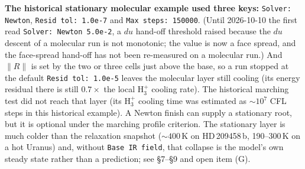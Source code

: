 \documentclass[english,a4paper]{my_memo}
\begin{document}
\textbf{The historical stationary molecular example used three keys:} \texttt{Solver: Newton}, \texttt{Resid tol: 1.0e-7} and
\texttt{Max steps: 150000}. (Until 2026-10-10 the first read
\texttt{Solver: Newton 5.0e-2}, a $du$ hand-off threshold raised because the
$du$ descent of a molecular run is not monotonic; the value is now a face
spread, and the face-spread hand-off has not been re-measured on a molecular
run.) And $\|R\|$ is set by the two or three cells just above the base,
so a run stopped at the default \texttt{Resid tol: 1.0e-5} leaves the molecular
layer still cooling (its energy residual there is still $0.7\times$ the local
H$_3^+$ cooling rate). The historical marching test did not reach that layer (its H$_3^+$
cooling time was estimated as ${\sim}10^{7}$ CFL steps in this
historical example). A Newton finish can supply a stationary root, but it
is optional under the marching profile criterion. The stationary layer is much colder than the relaxation snapshot
(${\sim}400$\,K on HD\,209458\,b, 190--300\,K on a hot Uranus) and, without
\texttt{Base IR field}, that collapse is the model's own steady state rather
than a prediction; see  \S7--\S9
and open item (G).
\end{document}
